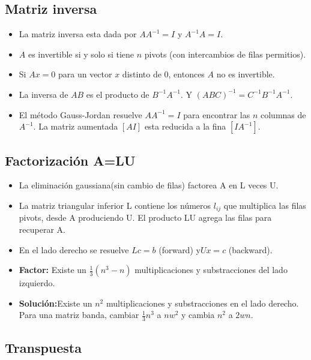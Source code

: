 \documentclass[]{article}
\begin{document}
\subsection{Matriz inversa}

\begin{itemize}
	
	\item La matriz inversa esta dada por $ AA^{-1} = I $ y   $ A^{-1}A = I $. 
	
	\item $ A $ es invertible si y solo si tiene $ n $ pivots (con intercambios de filas permitios). 
	
	\item Si $ Ax=0 $ para un vector $ x $ distinto de $ 0 $, entonces $ A $ no es invertible. 
	
	\item La inversa de $ AB $ es el producto de $ B^{-1}A^{-1} $. Y $ (ABC)^{-1}=C^{-1}B^{-1}A^{-1} $. 
	
	\item El m\'etodo Gauss-Jordan resuelve $ AA^{-1}=I $ para encontrar las $ n $ columnas de $ A^{-1} $. La matriz aumentada $ [AI] $ esta reducida a la fina $ [I A^{-1}] $.  
	 
	
\end{itemize}

\subsection{Factorizaci\'on A=LU}

\begin{itemize}
	\item La eliminación gaussiana(sin cambio de filas) factorea A en L veces U.
	\item La matriz triangular inferior L contiene los números $l_{ij}$ que multiplica las filas pivots, desde A produciendo U. El producto LU agrega las filas para recuperar A.
	\item En el lado derecho se resuelve $Lc=b$ (forward) y$Ux=c$ (backward).
	\item \textbf{Factor:} Existe un $\frac{1}{3}(n^3-n)$ multiplicaciones y substracciones del lado izquierdo.
	\item \textbf{Solución:}Existe un $n^2$ multiplicaciones y substracciones en el lado derecho.
	Para una matriz banda, cambiar $\frac{1}{3}n^3$ a $nw^{2}$ y cambia $n^2$ a $2wn$.
\end{itemize}

\subsection{Transpuesta}
\end{document}
